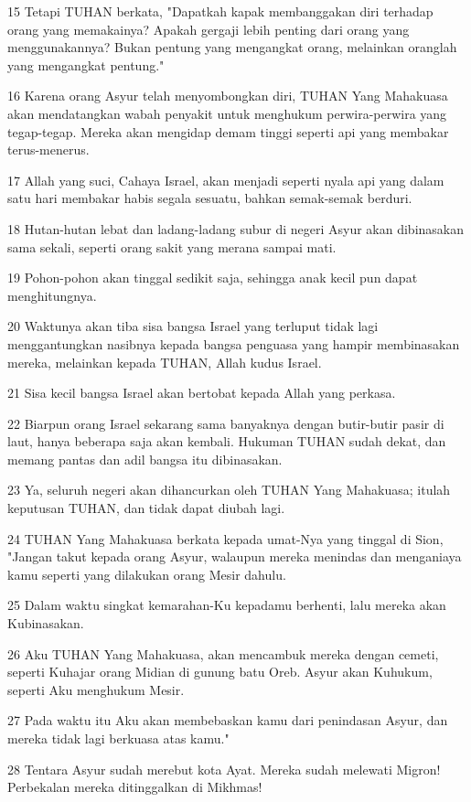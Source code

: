 \par 15 Tetapi TUHAN berkata, "Dapatkah kapak membanggakan diri terhadap orang yang memakainya? Apakah gergaji lebih penting dari orang yang menggunakannya? Bukan pentung yang mengangkat orang, melainkan oranglah yang mengangkat pentung."
\par 16 Karena orang Asyur telah menyombongkan diri, TUHAN Yang Mahakuasa akan mendatangkan wabah penyakit untuk menghukum perwira-perwira yang tegap-tegap. Mereka akan mengidap demam tinggi seperti api yang membakar terus-menerus.
\par 17 Allah yang suci, Cahaya Israel, akan menjadi seperti nyala api yang dalam satu hari membakar habis segala sesuatu, bahkan semak-semak berduri.
\par 18 Hutan-hutan lebat dan ladang-ladang subur di negeri Asyur akan dibinasakan sama sekali, seperti orang sakit yang merana sampai mati.
\par 19 Pohon-pohon akan tinggal sedikit saja, sehingga anak kecil pun dapat menghitungnya.
\par 20 Waktunya akan tiba sisa bangsa Israel yang terluput tidak lagi menggantungkan nasibnya kepada bangsa penguasa yang hampir membinasakan mereka, melainkan kepada TUHAN, Allah kudus Israel.
\par 21 Sisa kecil bangsa Israel akan bertobat kepada Allah yang perkasa.
\par 22 Biarpun orang Israel sekarang sama banyaknya dengan butir-butir pasir di laut, hanya beberapa saja akan kembali. Hukuman TUHAN sudah dekat, dan memang pantas dan adil bangsa itu dibinasakan.
\par 23 Ya, seluruh negeri akan dihancurkan oleh TUHAN Yang Mahakuasa; itulah keputusan TUHAN, dan tidak dapat diubah lagi.
\par 24 TUHAN Yang Mahakuasa berkata kepada umat-Nya yang tinggal di Sion, "Jangan takut kepada orang Asyur, walaupun mereka menindas dan menganiaya kamu seperti yang dilakukan orang Mesir dahulu.
\par 25 Dalam waktu singkat kemarahan-Ku kepadamu berhenti, lalu mereka akan Kubinasakan.
\par 26 Aku TUHAN Yang Mahakuasa, akan mencambuk mereka dengan cemeti, seperti Kuhajar orang Midian di gunung batu Oreb. Asyur akan Kuhukum, seperti Aku menghukum Mesir.
\par 27 Pada waktu itu Aku akan membebaskan kamu dari penindasan Asyur, dan mereka tidak lagi berkuasa atas kamu."
\par 28 Tentara Asyur sudah merebut kota Ayat. Mereka sudah melewati Migron! Perbekalan mereka ditinggalkan di Mikhmas!
